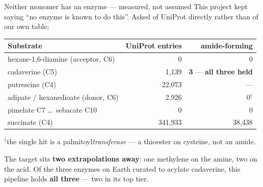 \documentclass[aspectratio=169,10pt]{beamer}
\newcommand{\good}[1]{{\color{cGood}\textbf{#1}}}
\newcommand{\bad}[1]{{\color{cBad}#1}}
\newcommand{\takeaway}[1]{\vfill\begin{tcolorbox}[colback=structure!12!white,
  colframe=structure!60!black,boxrule=0.4pt,left=5pt,right=5pt,top=3pt,bottom=3pt]
  \small #1\end{tcolorbox}}
\begin{document}
\begin{frame}{Neither monomer has an enzyme --- measured, not assumed}
  This project kept saying ``no enzyme is known to do this''. Asked of UniProt
  directly rather than of our own table:

  \smallskip
  \centering\footnotesize
  \begin{tabular}{lrr}
    \toprule
    \textbf{Substrate} & \textbf{UniProt entries} & \textbf{amide-forming} \\
    \midrule
    \bad{hexane-1,6-diamine} (acceptor, C6) & 0 & \bad{0} \\
    cadaverine (C5) & 1{,}139 & \good{3} --- \textbf{all three held} \\
    putrescine (C4) & 22{,}073 & --- \\
    \midrule
    \bad{adipate / hexanedioate} (donor, C6) & 2{,}926 & \bad{0}$^\dagger$ \\
    pimelate C7 \ldots\ sebacate C10 & 0 & 0 \\
    succinate (C4) & 341{,}933 & 38{,}438 \\
    \bottomrule
  \end{tabular}

  \smallskip
  {\scriptsize $^\dagger$the single hit is a palmitoyl\emph{transferase} ---
  a thioester on cysteine, not an amide.}

  \takeaway{The target sits \textbf{two extrapolations away}: one methylene on
  the amine, two on the acid. Of the three enzymes on Earth curated to
  acylate cadaverine, this pipeline holds \good{all three} --- two in its top
  tier.}
\end{frame}
\end{document}
